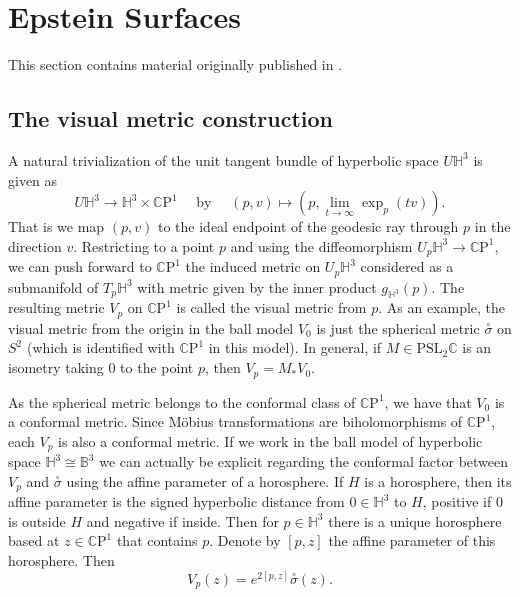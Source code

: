 \documentclass{amsart}
\newcommand{\C}{\mathbb{C}}
\newcommand{\CP}{\mathbb{C}\mathrm{P}}
\renewcommand{\H}{\mathbb{H}}
\begin{document}
\section{Epstein Surfaces} \label{epstein-surfaces}

\begin{center}This section contains material originally published in \cite{quinn2020}.
\end{center}

\subsection{The visual metric construction}


A natural trivialization of the unit tangent bundle of hyperbolic space $U\H^3$ is given as
\[
U\H^3 \to \H^3 \times \CP^1
\quad \text{ by } \quad
(p,v) \mapsto (p, \lim_{t \to \infty} \exp_p (tv) ).
\]
That is we map $(p,v)$ to the ideal endpoint of the geodesic ray through $p$ in the direction $v$. 
Restricting to a point $p$ and using the diffeomorphism $U_p\H^3 \to \CP^1$, we can push forward to $\CP^1$ the induced metric on $U_p\H^3$ considered as a submanifold of $T_p\H^3$ with metric given by the inner product $g_{\H^3}(p)$. 
The resulting metric $V_p$ on $\CP^1$ is called the visual metric from $p$.
As an example, the visual metric from the origin in the ball model $V_0$ is just the spherical metric $\overset{\circ}{\sigma}$ on $S^2$ (which is identified with $\CP^1$ in this model). 
In general, if $M \in \mathrm{PSL}_2\C$ is an isometry taking $0$ to the point $p$, then $V_p = M_*V_0$. 

As the spherical metric belongs to the conformal class of $\CP^1$, we have that $V_0$ is a conformal metric. 
Since M\"obius transformations are biholomorphisms of $\CP^1$, each $V_p$ is also a conformal metric. 
If we work in the ball model of hyperbolic space $\H^3 \cong \mathbb{B}^3$ we can actually be explicit regarding the conformal factor between $V_p$ and $\overset{\circ}{\sigma}$ using the affine parameter of a horosphere. 
If $H$ is a horosphere, then its affine parameter is the signed hyperbolic distance from $0 \in \H^3$ to $H$, positive if $0$ is outside $H$ and negative if inside. 
Then for $p \in \H^3$ there is a unique horosphere based at $z \in \CP^1$ that contains $p$. 
Denote by $[p,z]$ the affine parameter of this horosphere. 
Then
\[
V_p(z) = e^{2[p,z]}\overset{\circ}{\sigma}(z).
\]
\end{document}
